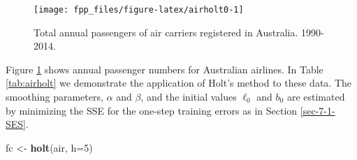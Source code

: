 \documentclass[]{book}
\newenvironment{Shaded}{\begin{snugshade}}{\end{snugshade}}
\newcommand{\DataTypeTok}[1]{\textcolor[rgb]{0.13,0.29,0.53}{#1}}
\newcommand{\DecValTok}[1]{\textcolor[rgb]{0.00,0.00,0.81}{#1}}
\newcommand{\KeywordTok}[1]{\textcolor[rgb]{0.13,0.29,0.53}{\textbf{#1}}}
\newcommand{\NormalTok}[1]{#1}
\newcommand{\StringTok}[1]{\textcolor[rgb]{0.31,0.60,0.02}{#1}}
\begin{document}
\begin{figure}

{\centering \texttt{[image: fpp\_files/figure-latex/airholt0-1]} 

}

\caption{Total annual passengers of air carriers registered in Australia. 1990-2014.}\label{fig:airholt0}
\end{figure}

Figure \ref{fig:airholt0} shows annual passenger numbers for Australian airlines. In Table \ref{tab:airholt} we demonstrate the application of Holt's method to these data. The smoothing parameters, \(\alpha\) and \(\beta\), and the initial values \(\ell_0\) and \(b_0\) are estimated by minimizing the SSE for the one-step training errors as in Section \ref{sec-7-1-SES}.

\begin{Shaded}
\begin{Highlighting}[]
\NormalTok{fc <-}\StringTok{ }\KeywordTok{holt}\NormalTok{(air, }\DataTypeTok{h=}\DecValTok{5}\NormalTok{)}
\end{Highlighting}
\end{Shaded}
\end{document}
